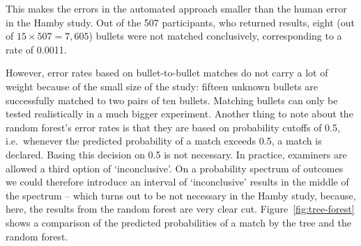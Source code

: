 \documentclass[aoas, preprint]{imsart}\usepackage[]{graphicx}\usepackage[]{color}
\newcommand{\hh}[1]{{\color{magenta} #1}}
\begin{document}
This makes the errors in the automated approach smaller than the human error in the Hamby study. Out of the 507 participants, who returned results, eight (out of $15 \times 507 = 7,605$) bullets were not matched conclusively, corresponding to a rate of 0.0011. 

However, error rates based on bullet-to-bullet matches do not carry a lot of weight because of the small size of the study: fifteen unknown bullets are successfully matched to two pairs of ten bullets. Matching bullets can only be tested realistically in a much bigger experiment. 
Another thing to note about  the random forest's error rates is that they are based on probability cutoffs of 0.5, i.e.\ whenever the predicted probability of a match exceeds 0.5, a match is declared. Basing this decision on 0.5 is not necessary. In practice, examiners are allowed a third option of `inconclusive'. On a probability spectrum of outcomes we could therefore introduce an interval of `inconclusive' results in the middle of the spectrum -- which turns out to be not necessary in the Hamby study, because, here, the results from the random forest are very clear cut. Figure~\ref{fig:tree-forest} shows a comparison of the predicted probabilities of a match by the tree and the random forest. %
\end{document}
